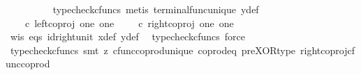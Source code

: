 \begin{isabellebody}
\ \ \ \ \ \ \ \ \isamarkupfalse%
\ {\isacharparenleft}{\kern0pt}typecheck{\isacharunderscore}{\kern0pt}cfuncs{\isacharcomma}{\kern0pt}\ metis\ terminal{\isacharunderscore}{\kern0pt}func{\isacharunderscore}{\kern0pt}unique\ y{\isacharunderscore}{\kern0pt}def{\isacharparenright}{\kern0pt}\isanewline
\ \ \ \ \ \ \isamarkupfalse%
\ \isamarkupfalse%
\ {\isachardoublequoteopen}{\isasymlangle}{\isasymt}{\isacharcomma}{\kern0pt}{\isasymf}{\isasymrangle}\ {\isasymamalg}\ {\isasymlangle}{\isasymf}{\isacharcomma}{\kern0pt}{\isasymt}{\isasymrangle}\ {\isasymcirc}\isactrlsub c\ left{\isacharunderscore}{\kern0pt}coproj\ one\ one\ {\isacharequal}{\kern0pt}\ {\isasymlangle}{\isasymt}{\isacharcomma}{\kern0pt}{\isasymf}{\isasymrangle}\ {\isasymamalg}\ {\isasymlangle}{\isasymf}{\isacharcomma}{\kern0pt}{\isasymt}{\isasymrangle}\ {\isasymcirc}\isactrlsub c\ right{\isacharunderscore}{\kern0pt}coproj\ one\ one{\isachardoublequoteclose}\isanewline
\ \ \ \ \ \ \ \ \isamarkupfalse%
\ w{\isacharunderscore}{\kern0pt}is\ eqs\ id{\isacharunderscore}{\kern0pt}right{\isacharunderscore}{\kern0pt}unit{}\ x{\isacharunderscore}{\kern0pt}def\ y{\isacharunderscore}{\kern0pt}def\ \isamarkupfalse%
\ {\isacharparenleft}{\kern0pt}typecheck{\isacharunderscore}{\kern0pt}cfuncs{\isacharcomma}{\kern0pt}\ force{\isacharparenright}{\kern0pt}\isanewline
\ \ \ \ \ \ \isamarkupfalse%
\ \isamarkupfalse%
\ {\isachardoublequoteopen}{\isasymlangle}{\isasymt}{\isacharcomma}{\kern0pt}{\isasymf}{\isasymrangle}\ {\isacharequal}{\kern0pt}\ {\isasymlangle}{\isasymf}{\isacharcomma}{\kern0pt}{\isasymt}{\isasymrangle}{\isachardoublequoteclose}\isanewline
\ \ \ \ \ \ \ \ \isamarkupfalse%
\ {\isacharparenleft}{\kern0pt}typecheck{\isacharunderscore}{\kern0pt}cfuncs{\isacharcomma}{\kern0pt}\ smt\ {\isacharparenleft}{\kern0pt}z{}{\isacharparenright}{\kern0pt}\ cfunc{\isacharunderscore}{\kern0pt}coprod{\isacharunderscore}{\kern0pt}unique\ coprod{\isacharunderscore}{\kern0pt}eq{}\ pre{\isacharunderscore}{\kern0pt}XOR{\isacharunderscore}{\kern0pt}type\ right{\isacharunderscore}{\kern0pt}coproj{\isacharunderscore}{\kern0pt}cfunc{\isacharunderscore}{\kern0pt}coprod{\isacharparenright}{\kern0pt}\ \ \ \ \ \ \isanewline
\ \ \ \ \ \ \isamarkupfalse%
\ \isamarkupfalse%
\ {\isachardoublequoteopen}{\isasymt}\ {\isacharequal}{\kern0pt}\ {\isasymf}\ {\isasymand}\ {\isasymf}\ {\isacharequal}{\kern0pt}\ {\isasymt}{\isachardoublequoteclose}\isanewline

\end{isabellebody}
